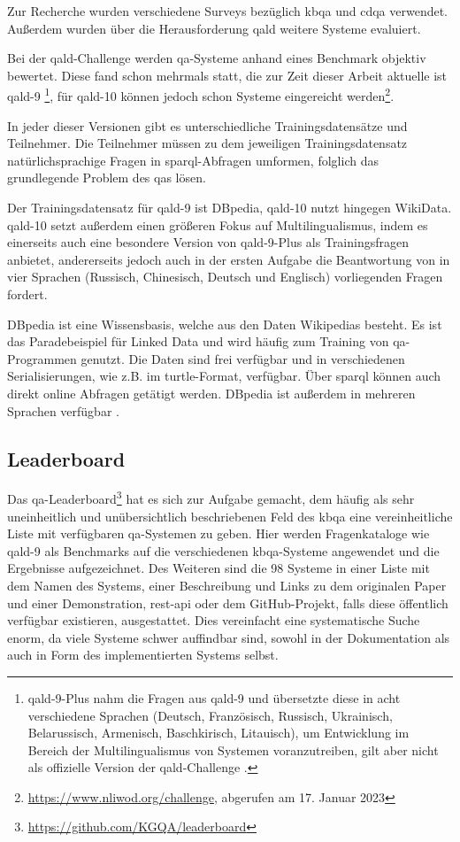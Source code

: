 Zur Recherche wurden verschiedene Surveys bezüglich \ac{kbqa} und \ac{cdqa} verwendet.
Außerdem wurden über die Herausforderung \ac{qald} weitere Systeme evaluiert.

Bei der \ac{qald}-Challenge werden \ac{qa}-Systeme anhand eines Benchmark objektiv bewertet.
Diese fand schon mehrmals statt, die zur Zeit dieser Arbeit aktuelle ist \ac{qald}-9 \citep{qald9}\footnote{\ac{qald}-9-Plus
nahm die Fragen aus \ac{qald}-9 und übersetzte diese in acht verschiedene Sprachen (Deutsch, Französisch, Russisch, Ukrainisch, Belarussisch, Armenisch, Baschkirisch, Litauisch),
um Entwicklung im Bereich der Multilingualismus von Systemen voranzutreiben, gilt aber nicht als offizielle Version der \ac{qald}-Challenge \citep{qald9plus}.},
für \ac{qald}-10 können jedoch schon Systeme eingereicht werden\footnote{\url{https://www.nliwod.org/challenge}, abgerufen am 17. Januar 2023}.

In jeder dieser Versionen gibt es unterschiedliche Trainingsdatensätze und Teilnehmer.
Die Teilnehmer müssen zu dem jeweiligen Trainingsdatensatz natürlichsprachige Fragen in \ac{sparql}-Abfragen umformen,
folglich das grundlegende Problem des \acl{qa}s lösen.

Der Trainingsdatensatz für \ac{qald}-9 ist DBpedia, \ac{qald}-10 nutzt hingegen WikiData.
\ac{qald}-10 setzt außerdem einen größeren Fokus auf Multilingualismus, indem es einerseits auch eine besondere Version von \ac{qald}-9-Plus als Trainingsfragen anbietet,
andererseits jedoch auch in der ersten Aufgabe die Beantwortung von in vier Sprachen (Russisch, Chinesisch, Deutsch und Englisch) vorliegenden Fragen fordert.

DBpedia ist eine Wissensbasis, welche aus den Daten Wikipedias besteht.
Es ist das Paradebeispiel für Linked Data und wird häufig zum Training von \ac{qa}-Programmen genutzt.
Die Daten sind frei verfügbar und in verschiedenen Serialisierungen, wie z.B. im \ac{turtle}-Format, verfügbar.
Über \ac{sparql} können auch direkt online Abfragen getätigt werden.
DBpedia ist außerdem in mehreren Sprachen verfügbar \citep{dbpedia}.

\subsection{Leaderboard}

Das \acl{qa}-Leaderboard\footnote{\url{https://github.com/KGQA/leaderboard}} \citep{kgqaleaderboard} hat es sich zur Aufgabe gemacht,
dem häufig als sehr uneinheitlich und unübersichtlich \citep{diefenbachkbqa} beschriebenen Feld des \ac{kbqa} eine vereinheitliche Liste mit verfügbaren \ac{qa}-Systemen zu geben.
Hier werden Fragenkataloge wie \ac{qald}-9 als Benchmarks auf die verschiedenen \ac{kbqa}-Systeme angewendet und die Ergebnisse aufgezeichnet.
Des Weiteren sind die 98 Systeme in einer Liste mit dem Namen des Systems, einer Beschreibung und Links zu dem originalen Paper und einer Demonstration,
\ac{rest}-\ac{api} oder dem GitHub-Projekt, falls diese öffentlich verfügbar existieren, ausgestattet.
Dies vereinfacht eine systematische Suche enorm, da viele Systeme schwer auffindbar sind, sowohl in der Dokumentation als auch in Form des implementierten Systems selbst.

